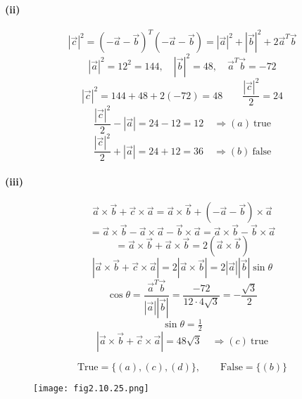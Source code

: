 \documentclass[journal]{IEEEtran}
\begin{document}
\paragraph{(ii)}
\[
|\vec c|^{2}=(-\vec a-\vec b)^{T}(-\vec a-\vec b)=|\vec a|^{2}+|\vec b|^{2}+2\vec a^{T}\vec b
\]
\[
|\vec a|^{2}=12^{2}=144,\quad |\vec b|^{2}=48,\quad \vec a^{T}\vec b=-72
\]
\[
|\vec c|^{2}=144+48+2(-72)=48\qquad\frac{|\vec c|^{2}}{2}=24
\]
\[
\frac{|\vec c|^{2}}{2}-|\vec a|=24-12=12\quad\Rightarrow (a)\ \text{true}
\]
\[
\frac{|\vec c|^{2}}{2}+|\vec a|=24+12=36\quad\Rightarrow (b)\ \text{false}
\]

\paragraph{(iii)}
\[
\vec a\times\vec b+\vec c\times\vec a=\vec a\times\vec b+(-\vec a-\vec b)\times\vec a
\]
\[
=\vec a\times\vec b-\vec a\times\vec a-\vec b\times\vec a= \vec a\times\vec b-\vec b\times\vec a
\]
\[
=\vec a\times\vec b+\vec a\times\vec b=2(\vec a\times\vec b)
\]
\[
|\vec a\times\vec b+\vec c\times\vec a|=2|\vec a\times\vec b|=2|\vec a||\vec b|\sin\theta
\]
\[
\cos\theta=\dfrac{\vec a^{T}\vec b}{|\vec a||\vec b|}=\dfrac{-72}{12\cdot4\sqrt3}=-\dfrac{\sqrt3}{2}
\]
\[
\sin\theta=\tfrac12
\]
\[
|\vec a\times\vec b+\vec c\times\vec a|=48\sqrt3\quad\Rightarrow (c)\ \text{true}
\]

\[
\boxed{\text{True}=\{(a),(c),(d)\},\qquad \text{False}=\{(b)\}}
\]




\begin{figure}[ht!]
    \centering
    \texttt{[image: fig2.10.25.png]}
    \caption{}
    \label{fig:1.2.27.jpg}
\end{figure}
\end{document}
